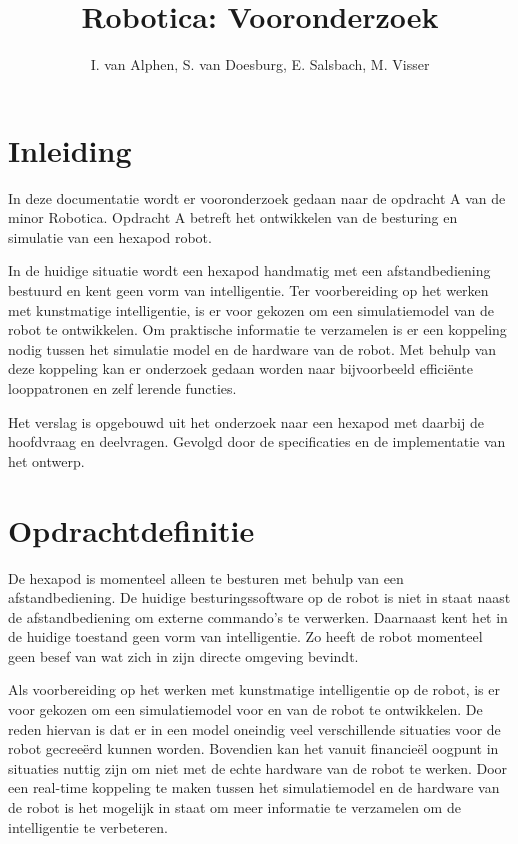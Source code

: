 \documentclass[10pt,a4paper]{article}
\title{Robotica: Vooronderzoek}
\author{I. van Alphen, S. van Doesburg, E.  Salsbach, M. Visser}
\begin{document}
\maketitle
\newpage

\tableofcontents
\newpage

\iffalse %
\section{Samenvatting}
Not in use yet
\newpage
\fi

\section{Inleiding}
In deze documentatie wordt er vooronderzoek gedaan naar de opdracht A van de minor Robotica. Opdracht A betreft het ontwikkelen van de besturing en simulatie van een hexapod robot.\cite{beroepsopdrachten}

In de huidige situatie wordt een hexapod handmatig met een afstandbediening bestuurd en kent geen vorm van intelligentie. Ter voorbereiding op het werken met kunstmatige intelligentie, is er voor gekozen om een simulatiemodel van de robot te ontwikkelen. Om praktische informatie te verzamelen is er een koppeling nodig tussen het simulatie model en de hardware van de robot. Met behulp van deze koppeling kan er onderzoek gedaan worden naar bijvoorbeeld effici\"ente looppatronen en zelf lerende functies.

Het verslag is opgebouwd uit het onderzoek naar een hexapod met daarbij de hoofdvraag en deelvragen. Gevolgd door de specificaties en de implementatie van het ontwerp.

\newpage

\section{Opdrachtdefinitie}
De hexapod is momenteel alleen te besturen met behulp van een afstandbediening. De huidige besturingssoftware op de robot is niet in staat naast de afstandbediening om externe commando's te verwerken. Daarnaast kent het in de huidige toestand geen vorm van intelligentie. Zo heeft de robot momenteel geen besef van wat zich in zijn directe omgeving bevindt.

Als voorbereiding op het werken met kunstmatige intelligentie op de robot, is er voor gekozen om een simulatiemodel voor en van de robot te ontwikkelen. De reden hiervan is dat er in een model oneindig veel verschillende situaties voor de robot gecree\"erd kunnen worden. Bovendien kan het vanuit financie\"el oogpunt in situaties nuttig zijn om niet met de echte hardware van de robot te werken. 
Door een real-time koppeling te maken tussen het simulatiemodel en de hardware van de robot is het mogelijk in staat om meer informatie te verzamelen om de intelligentie te verbeteren.
\end{document}

